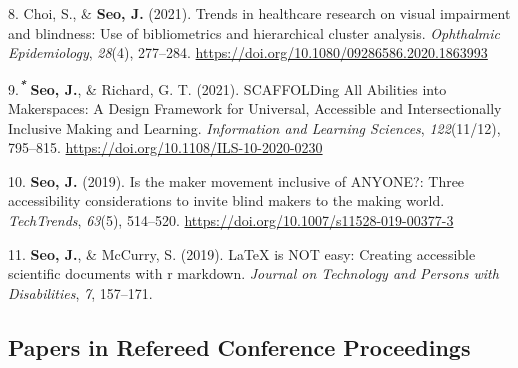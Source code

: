 \documentclass[11pt,a4paper,]{awesome-cv}
\newlength{\cslhangindent}
\newenvironment{CSLReferences}[2] %
 {\begin{list}{}{%
  \setlength{\itemindent}{0pt}
  \setlength{\leftmargin}{0pt}
  \setlength{\parsep}{0pt}
  \ifodd #1
   \setlength{\leftmargin}{\cslhangindent}
   \setlength{\itemindent}{-1\cslhangindent}
  \fi
  \setlength{\itemsep}{#2\baselineskip}}}
 {\end{list}}
\begin{document}
\begin{CSLReferences}{1}{0}
8. Choi, S., \& \textbf{Seo, J.} (2021). Trends in healthcare research
on visual impairment and blindness: Use of bibliometrics and
hierarchical cluster analysis. \emph{Ophthalmic Epidemiology},
\emph{28}(4), 277--284.
\url{https://doi.org/10.1080/09286586.2020.1863993}

9.\textsuperscript{\textbf{\emph{*}}} \textbf{Seo, J.}, \& Richard, G.
T. (2021). SCAFFOLDing All Abilities into Makerspaces: A Design
Framework for Universal, Accessible and Intersectionally Inclusive
Making and Learning. \emph{Information and Learning Sciences},
\emph{122}(11/12), 795--815.
\url{https://doi.org/10.1108/ILS-10-2020-0230}

10. \textbf{Seo, J.} (2019). Is the maker movement inclusive of ANYONE?:
Three accessibility considerations to invite blind makers to the making
world. \emph{TechTrends}, \emph{63}(5), 514--520.
\url{https://doi.org/10.1007/s11528-019-00377-3}

11. \textbf{Seo, J.}, \& McCurry, S. (2019). LaTeX is NOT easy: Creating
accessible scientific documents with r markdown. \emph{Journal on
Technology and Persons with Disabilities}, \emph{7}, 157--171.

\end{CSLReferences}

\subsection{Papers in Refereed Conference
Proceedings}\label{papers-in-refereed-conference-proceedings-1}
\end{document}
